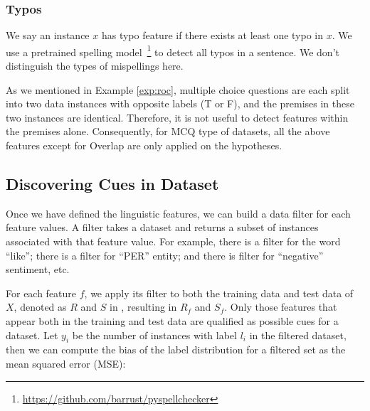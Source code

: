\subsubsection{Typos}
We say an instance $x$ has typo feature if there exists at least one
typo in $x$.
We use a pretrained spelling model~\footnote{\url{https://github.com/barrust/pyspellchecker}} 
to detect all typos in a sentence. We don't distinguish the types of mispellings here. 

As we mentioned in Example \ref{exp:roc}, multiple choice questions are each split into 
two data instances with opposite labels (T or F), and the premises in these two
instances are identical. Therefore, it is not useful to detect features within the premises
alone. Consequently, for MCQ type of datasets, all the above features except for Overlap
are only applied on the hypotheses.

\subsection{Discovering Cues in Dataset}
\label{sec:evaldata}
Once we have defined the linguistic features, we can build a data filter for
each feature values. A filter takes a dataset and returns
a subset of instances associated with that feature value. For example,
there is a filter for the word ``like''; there is a filter for ``PER'' entity;
and there is filter for ``negative'' sentiment, etc. 

For each feature $f$, we apply its filter to both the training data and test data
of $X$, denoted as $R$ and $S$ in ,
resulting in $R_f$ and $S_f$. 
Only those features that appear both in the training and test data
are qualified as possible cues for a dataset.
Let $y_i$ be the number of instances with label $l_i$ in the filtered
dataset, then we can compute the bias of the label distribution for a filtered
set as the mean squared error (MSE):

